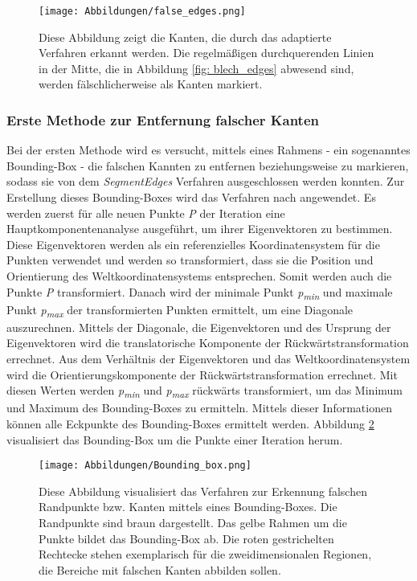 \begin{figure}[h]
	\texttt{[image: Abbildungen/false\_edges.png]}
	\centering
	\caption{Diese Abbildung zeigt die Kanten, die durch das adaptierte Verfahren erkannt werden. Die regelmäßigen durchquerenden Linien in der Mitte, die in Abbildung \ref{fig: blech_edges} abwesend sind, werden fälschlicherweise als Kanten markiert. }
	\label{fig: false_edges}
\end{figure}

\subsubsection{Erste Methode zur Entfernung falscher Kanten}
Bei der ersten Methode wird es versucht, mittels eines Rahmens - ein sogenanntes Bounding-Box - die falschen Kannten zu entfernen beziehungsweise zu markieren, sodass sie von dem \textit{SegmentEdges} Verfahren ausgeschlossen werden konnten. Zur Erstellung dieses Bounding-Boxes wird das Verfahren nach \textcite{noauthor_find_2015} angewendet. Es werden zuerst für alle neuen Punkte \textit{P} der Iteration eine Hauptkomponentenanalyse ausgeführt, um ihrer Eigenvektoren zu bestimmen. Diese Eigenvektoren werden als ein referenzielles Koordinatensystem für die Punkten verwendet und werden so transformiert, dass sie die Position und Orientierung des Weltkoordinatensystems entsprechen. Somit werden auch die Punkte \textit{P} transformiert. Danach wird der minimale Punkt \textit{p\textsubscript{min}} und maximale Punkt \textit{p\textsubscript{max}} der transformierten Punkten ermittelt, um eine Diagonale auszurechnen. Mittels der Diagonale, die Eigenvektoren und des Ursprung der Eigenvektoren wird die translatorische Komponente der Rückwärtstransformation errechnet. Aus dem Verhältnis der Eigenvektoren und das Weltkoordinatensystem wird die Orientierungskomponente der Rückwärtstransformation errechnet. Mit diesen Werten werden \textit{p\textsubscript{min}} und \textit{p\textsubscript{max}} rückwärts transformiert, um das Minimum und Maximum des Bounding-Boxes zu ermitteln. Mittels dieser Informationen können alle Eckpunkte des Bounding-Boxes ermittelt werden. Abbildung \ref{fig: bounding_box} visualisiert das Bounding-Box um die Punkte einer Iteration herum.

\begin{figure}[h]
	\texttt{[image: Abbildungen/Bounding\_box.png]}
	\centering
	\caption{Diese Abbildung visualisiert das Verfahren zur Erkennung falschen Randpunkte bzw. Kanten mittels eines Bounding-Boxes. Die Randpunkte sind braun dargestellt. Das gelbe Rahmen um die Punkte bildet das Bounding-Box ab. Die roten gestrichelten Rechtecke stehen exemplarisch für die zweidimensionalen Regionen, die Bereiche mit falschen Kanten abbilden sollen.}
	\label{fig: bounding_box}
\end{figure}

